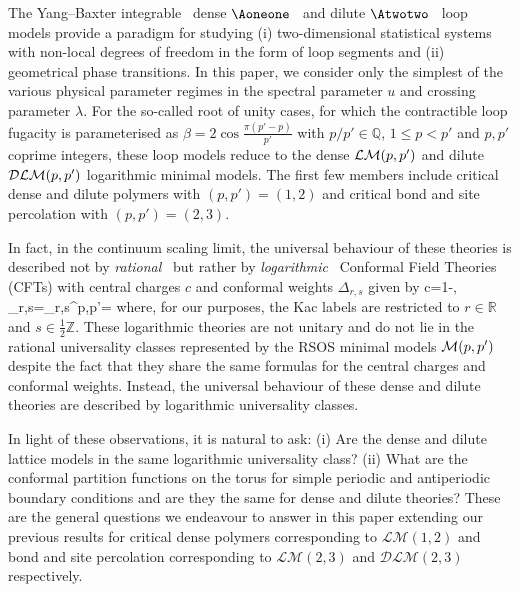 \documentclass[11pt]{article}
\numberwithin{equation}{section}
\theoremstyle{definition}
\numberwithin{equation}{section}
\renewcommand{\le}{\leqslant}
\begin{document}
The Yang--Baxter integrable~\cite{BaxBook} dense 
$\Aoneone$~\cite{Nienhuis82,BloteNienhuis89,YB95,PRZ2006,PR2007,SAPR2009,PR2011,MDPR2013,MDPR2014,MDKP17} and dilute 
$\Atwotwo$~\cite{DJS2010,SAPR2012,G12,FeherNien2015,GarbNien2017,MDP19,MDKP23} loop models provide a paradigm for studying (i) two-dimensional statistical systems with non-local degrees of freedom in the form of loop segments and (ii) geometrical phase transitions. 
In this paper, we consider only the simplest of the various physical parameter regimes in the spectral parameter $u$ and crossing parameter $\lambda$. For the so-called root of unity cases, for which the contractible loop fugacity is parameterised as $\beta=2\cos\tfrac{\pi(p'-p)}{p'}$ with $p/p'\in\mathbb{Q}$, $1\le p<p'$ and $p,p'$ coprime integers, these loop models reduce to the dense ${\cal LM}(p,p')$ and dilute ${\cal DLM}(p,p')$ logarithmic minimal models. The first few members include critical dense and dilute polymers with $(p,p')=(1,2)$ and critical bond and site percolation with $(p,p')=(2,3)$.

In fact, in the continuum scaling limit, the universal behaviour of these theories is described not by {\em rational}~\cite{FMS,MooreSeiberg} but rather by {\em logarithmic}~\cite{Gurarie,SpecialIssue} Conformal Field Theories (CFTs) with central charges $c$ and conformal weights $\Delta_{r,s}$ given by
\be
c=1-, 
\qquad
\Delta_{r,s}=\Delta_{r,s}^{p,p'}=
\label{LogMinConfWts}
\ee
where, for our purposes, the Kac labels are restricted to 
$r \in \mathbb R$ and $s\in\frac 12 \mathbb{Z}$. These logarithmic theories are not unitary and do not lie in the rational universality classes represented by the RSOS minimal models ${\cal M}(p,p')$~\cite{BPZ,ABF,FB} despite the fact that they share the same formulas for the central charges and conformal weights. Instead, the universal behaviour of these dense and dilute theories are described by logarithmic universality classes.

In light of these observations, it is natural to ask: (i) Are the dense and dilute lattice models in the same logarithmic universality class? 
(ii) What are the conformal partition functions on the torus for simple periodic and antiperiodic boundary conditions and are they the same for dense and dilute theories? These are the general questions we endeavour to answer in this paper extending our previous results for critical dense polymers \cite{MDPR2013} corresponding to $\mathcal{LM}(1,2)$ and bond \cite{MDKP17} and site percolation \cite{MDKP23} corresponding to $\mathcal{LM}(2,3)$ and $\mathcal{DLM}(2,3)$ respectively.
\end{document}
